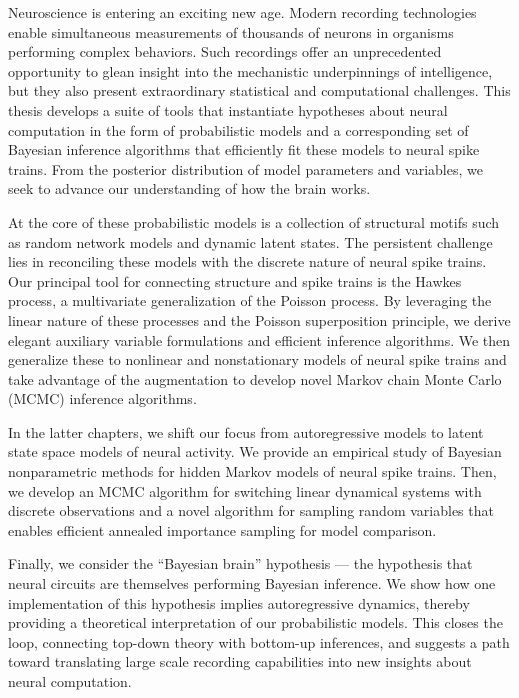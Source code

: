Neuroscience is entering an exciting new age.  Modern recording
technologies enable simultaneous measurements of
thousands of neurons in organisms performing complex behaviors.  Such
recordings offer an unprecedented opportunity to glean insight into
the mechanistic underpinnings of intelligence, but they also present
extraordinary statistical and computational challenges.
This thesis develops a suite of tools that instantiate
hypotheses about neural computation in the form of
probabilistic models and a corresponding set of Bayesian inference
algorithms that efficiently fit these models to neural spike trains.
From the posterior distribution of model parameters and variables,
we seek to advance our understanding of how the brain works. 

At the core of these probabilistic models is a collection of
structural motifs such as random network models and dynamic latent states. The
persistent challenge lies in reconciling these models with the
discrete nature of neural spike trains.  Our principal tool for
connecting structure and spike trains is the Hawkes process, a
multivariate generalization of the Poisson process.  By
leveraging the linear nature of these processes and the Poisson
superposition principle, we derive elegant auxiliary variable
formulations and efficient inference algorithms. We then generalize
these to nonlinear and nonstationary models of neural spike trains and
take advantage of the \polyagamma augmentation to develop novel
Markov chain Monte Carlo (MCMC) inference algorithms.

In the latter chapters, we shift our focus from autoregressive models
to latent state space models of neural activity. We provide an
empirical study of Bayesian nonparametric methods for hidden Markov
models of neural spike trains. Then, we develop an MCMC algorithm for switching
linear dynamical systems with discrete observations and a novel
algorithm for sampling \polyagamma random variables that enables 
efficient annealed importance sampling for model comparison.

Finally, we consider the ``Bayesian brain'' hypothesis --- the
hypothesis that neural circuits are themselves performing Bayesian
inference.  We show how one implementation of this
hypothesis implies autoregressive dynamics, thereby providing a theoretical interpretation of
our probabilistic models.  This closes the
loop, connecting top-down theory with bottom-up inferences, and
suggests a path toward translating large scale recording
capabilities into new insights about neural computation.



